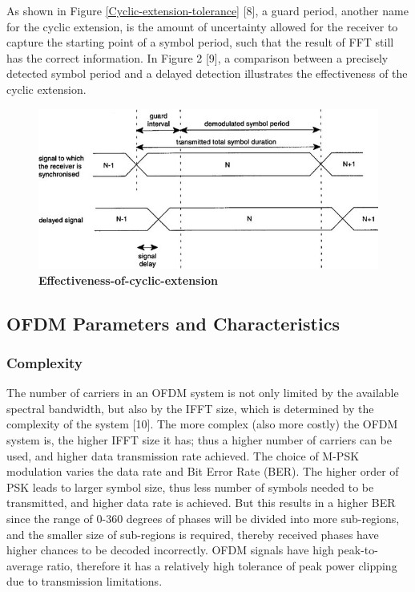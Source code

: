 As shown in Figure \ref{Cyclic-extension-tolerance} [8], a guard period, another name for the cyclic extension, is the amount of uncertainty allowed for the receiver to capture the starting point of a symbol period, such that the result of FFT still has the correct information. In Figure 2 [9], a comparison between a precisely detected symbol period and a delayed detection illustrates the effectiveness of the cyclic extension.

\begin{figure}[ht]
    \centering
    \includegraphics[width=\textwidth]{Figures/Effectiveness-of-cyclic-extension.jpg}
    \caption{\bfseries\centering\fontsize{13pt}{0pt}\selectfont Effectiveness-of-cyclic-extension}
    \label{Effectiveness-of-cyclic-extension}
\end{figure}

\subsection{OFDM Parameters and Characteristics}

\subsubsection{Complexity}

The number of carriers in an OFDM system is not only limited by the available spectral bandwidth, but also by the IFFT size, which is determined by the complexity of the system [10]. The more complex (also more costly) the OFDM system is, the higher IFFT size it has; thus a higher number of carriers can be used, and higher data transmission rate achieved. The choice of M-PSK modulation varies the data rate and Bit Error Rate (BER). The higher order of PSK leads to larger symbol size, thus less number of symbols needed to be transmitted, and higher data rate is achieved. But this results in a higher BER since the range of 0-360 degrees of phases will be divided into more sub-regions, and the smaller size of sub-regions is required, thereby received phases have higher chances to be decoded incorrectly. OFDM signals have high peak-to-average ratio, therefore it has a relatively high tolerance of peak power clipping due to transmission limitations.

